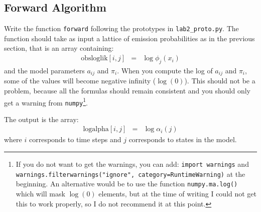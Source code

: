 \documentclass{nada-ten}
\begin{document}


\subsection{Forward Algorithm}
Write the function \texttt{forward} following the prototypes in \texttt{lab2\_proto.py}. The function should take as input a lattice of emission probabilities as in the previous section, that is an array containing:
\begin{eqnarray*}
 \mbox{obsloglik}[i,j] &=& \log \phi_j(x_i)
\end{eqnarray*}
and the model parameters $a_{ij}$ and $\pi_i$. When you compute the log of $a_{ij}$ and $\pi_i$, some of the values will become negative infinity ($\log(0)$). This should not be a problem, because all the formulas should remain consistent and you should only get a warning from \texttt{numpy}\footnote{If you do not want to get the warnings, you can add: \texttt{import warnings} and \texttt{warnings.filterwarnings("ignore", category=RuntimeWarning)} at the beginning. An alternative would be to use the function \texttt{numpy.ma.log()} which will mask $\log(0)$ elements, but at the time of writing I could not get this to work properly, so I do not recommend it at this point.}.

The output is the array:
\begin{eqnarray*}
  \mbox{logalpha}[i,j] &=& \log\alpha_i(j)
\end{eqnarray*}
where $i$ corresponds to time steps and $j$ corresponds to states in the model.

\end{document}
